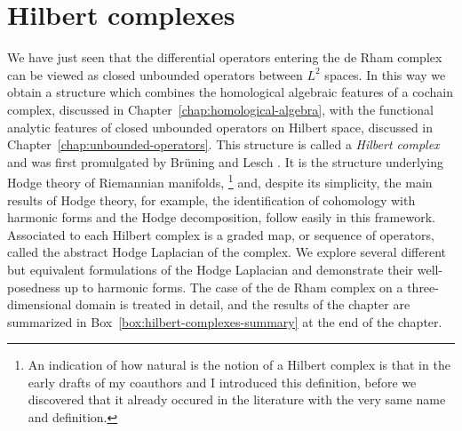 \clearpage\setcounter{section}{3}
\section{{Hilbert complexes}}\label{chap:hilbert-complexes}

{We have just seen that the differential operators entering the de Rham complex can be viewed as closed unbounded operators between $L^2$ spaces. In this way we obtain a structure which combines the homological algebraic features of a cochain complex, discussed in Chapter~\ref{chap:homological-algebra}, with the functional analytic features of closed unbounded operators on Hilbert space, discussed in Chapter~\ref{chap:unbounded-operators}. This structure is called a \emph{Hilbert complex} and was first promulgated by Brüning and Lesch . It is the structure underlying Hodge theory of Riemannian manifolds,}%
\footnote{{An indication of how natural is the notion of a Hilbert complex is that in the early drafts of  my coauthors and I introduced this definition, before we discovered that it already occured in the literature  with the very same name and definition.}}%
{and, despite its simplicity, the main results of Hodge theory, for example, the identification of cohomology with harmonic forms and the Hodge decomposition, follow easily in this framework. Associated to each Hilbert complex is a graded map, or sequence of operators, called the abstract Hodge Laplacian of the complex. We explore several different but equivalent formulations of the Hodge Laplacian and demonstrate their well-posedness up to harmonic forms. The case of the de Rham complex on a three-dimensional domain is treated in detail, and the results of the chapter are summarized in Box~\ref{box:hilbert-complexes-summary} at the end of the chapter.}
